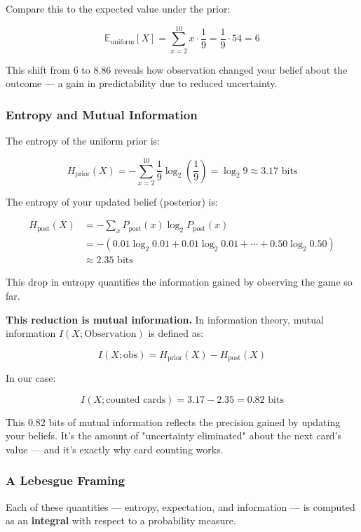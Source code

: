 Compare this to the expected value under the prior:

\[
\mathbb{E}_{\text{uniform}}[X] = \sum_{x=2}^{10} x \cdot \frac{1}{9}
= \frac{1}{9} \cdot 54 = 6
\]

This shift from 6 to 8.86 reveals how observation changed your belief about the outcome — a gain in predictability due to reduced uncertainty.

\subsubsection*{Entropy and Mutual Information}

The entropy of the uniform prior is:

\[
H_{\text{prior}}(X) = -\sum_{x=2}^{10} \frac{1}{9} \log_2 \left( \frac{1}{9} \right) = \log_2 9 \approx 3.17 \text{ bits}
\]

The entropy of your updated belief (posterior) is:

\[
\begin{aligned}
H_{\text{post}}(X) &= -\sum_x P_{\text{post}}(x) \log_2 P_{\text{post}}(x) \\
&= -\left( 0.01 \log_2 0.01 + 0.01 \log_2 0.01 + \cdots + 0.50 \log_2 0.50 \right) \\
&\approx 2.35 \text{ bits}
\end{aligned}
\]

This drop in entropy quantifies the information gained by observing the game so far.

\medskip
\noindent
\textbf{This reduction is mutual information.} In information theory, mutual information \( I(X; \text{Observation}) \) is defined as:

\[
I(X; \text{obs}) = H_{\text{prior}}(X) - H_{\text{post}}(X)
\]

In our case:

\[
I(X; \text{counted cards}) = 3.17 - 2.35 = \boxed{0.82 \text{ bits}}
\]

This 0.82 bits of mutual information reflects the precision gained by updating your beliefs. It’s the amount of "uncertainty eliminated" about the next card’s value — and it’s exactly why card counting works.

\subsubsection*{A Lebesgue Framing}

Each of these quantities — entropy, expectation, and information — is computed as an \textbf{integral} with respect to a probability measure.

